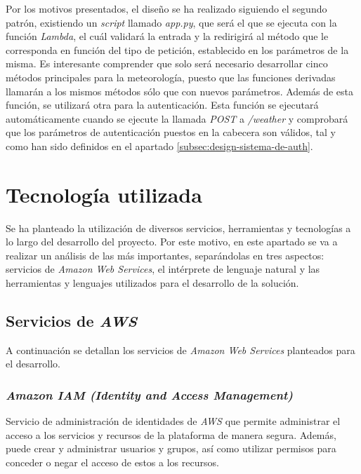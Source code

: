 \documentclass[11pt,spanish,listoffigures]{tfgetsinf}
\begin{document}
Por los motivos presentados, el diseño se ha realizado siguiendo el segundo patrón, existiendo un \textit{script} llamado \textit{app.py}, que será el que se ejecuta con la función \textit{Lambda}, el cuál validará la entrada y la redirigirá al método que le corresponda en función del tipo de petición, establecido en los parámetros de la misma. Es interesante comprender que solo será necesario desarrollar cinco métodos principales para la meteorología, puesto que las funciones derivadas llamarán a los mismos métodos sólo que con nuevos parámetros.
Además de esta función, se utilizará otra para la autenticación. Esta función se ejecutará automáticamente cuando se ejecute la llamada \textit{POST} a \textit{/weather} y comprobará que los parámetros de autenticación puestos en la cabecera son válidos, tal y como han sido definidos en el apartado \ref{subsec:design-sistema-de-auth}.



\section{Tecnología utilizada}
\label{sec:tecno-utilizada}

Se ha planteado la utilización de diversos servicios, herramientas y tecnologías a lo largo del desarrollo del proyecto. Por este motivo, en este apartado se va a realizar un análisis de las más importantes, separándolas en tres aspectos: servicios de \textit{Amazon Web Services}, el intérprete de lenguaje natural y las herramientas y lenguajes utilizados para el desarrollo de la solución. 


\subsection{Servicios de \textit{AWS}}
\label{subsec:servicios-de-aws}

A continuación se detallan los servicios de \textit{Amazon Web Services} planteados para el desarrollo.

\subsubsection{\textit{Amazon IAM (Identity and Access Management)}}

Servicio de administración de identidades de \textit{AWS} que permite administrar el acceso a los servicios y recursos de la plataforma de manera segura. Además, puede crear y administrar usuarios y grupos, así como utilizar permisos para conceder o negar el acceso de estos a los recursos.
\end{document}
